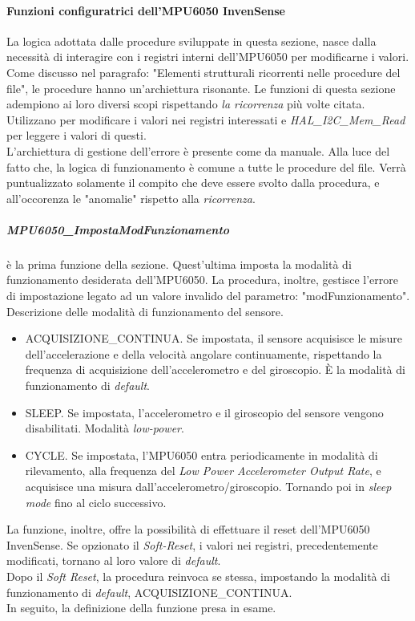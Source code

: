 \documentclass[11pt]{report}
\begin{document}
\paragraph{Funzioni configuratrici dell'MPU6050 InvenSense}
La logica adottata dalle procedure sviluppate in questa sezione, nasce dalla necessità di interagire con i registri interni dell'MPU6050 per modificarne i valori.\\
Come discusso nel paragrafo: "Elementi strutturali ricorrenti nelle procedure del file", le procedure hanno un'archiettura risonante. Le funzioni di questa sezione adempiono ai loro diversi scopi rispettando \textit{la ricorrenza} più volte citata.
Utilizzano  per modificare i valori nei registri interessati e \textit{HAL\_I2C\_Mem\_Read} per leggere i valori di questi.\\
L'archiettura di gestione dell'errore è presente come da manuale.
Alla luce del fatto che, la logica di funzionamento è comune a tutte le procedure del file. Verrà puntualizzato solamente il compito che deve essere svolto dalla procedura, e all'occorenza le "anomalie" rispetto alla \textit{ricorrenza}.
\subparagraph{MPU6050\_ImpostaModFunzionamento}
è la prima funzione della sezione. Quest'ultima imposta la modalità di funzionamento desiderata dell'MPU6050. La procedura, inoltre, gestisce l'errore di impostazione legato ad un valore invalido del parametro: "modFunzionamento".\\
Descrizione delle modalità di funzionamento del sensore.
\begin{itemize}
    \item ACQUISIZIONE\_CONTINUA. Se impostata, il sensore acquisisce le misure dell'accelerazione e della velocità angolare continuamente, rispettando la frequenza di acquisizione dell'accelerometro e del giroscopio. È la modalità di funzionamento di \textit{default}.
    \item SLEEP. Se impostata, l'accelerometro e il giroscopio del sensore vengono disabilitati. Modalità \textit{low-power}.
    \item CYCLE. Se impostata, l'MPU6050 entra periodicamente in modalità di rilevamento, alla frequenza del \textit{Low Power Accelerometer Output Rate}, e acquisisce una misura dall'accelerometro/giroscopio. Tornando poi in \textit{sleep mode} fino al ciclo successivo.
\end{itemize}
La funzione, inoltre, offre la possibilità di effettuare il reset dell'MPU6050 InvenSense. Se opzionato il \textit{Soft-Reset}, i valori nei registri, precedentemente modificati, tornano al loro valore di \textit{default}.\\
Dopo il \textit{Soft Reset}, la procedura reinvoca se stessa, impostando la modalità di funzionamento di \textit{default}, ACQUISIZIONE\_CONTINUA.\\
In seguito, la definizione della funzione presa in esame.

\end{document}
